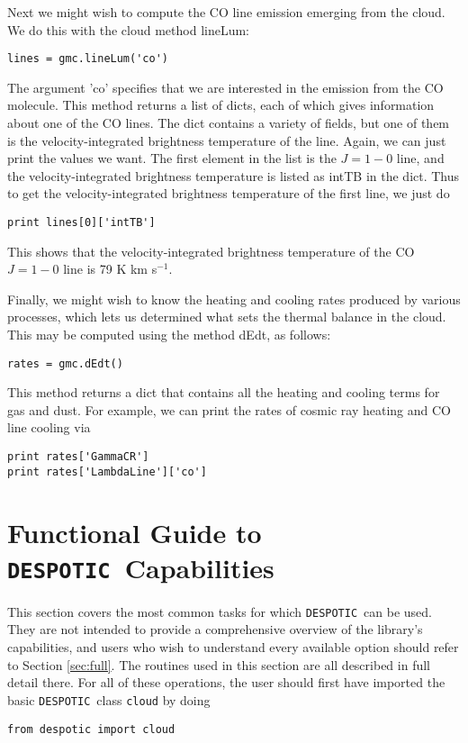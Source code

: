 \documentclass[12pt]{article}
\newcommand{\despotic}{\texttt{DESPOTIC}}
\begin{document}
Next we might wish to compute the CO line emission emerging from the cloud. We do this with the cloud method lineLum:
\begin{verbatim}
lines = gmc.lineLum('co')
\end{verbatim}
The argument 'co' specifies that we are interested in the emission from the CO molecule. This method returns a list of dicts, each of which gives information about one of the CO lines. The dict contains a variety of fields, but one of them is the velocity-integrated brightness temperature of the line. Again, we can just print the values we want. The first element in the list is the $J=1-0$ line, and the velocity-integrated brightness temperature is listed as intTB in the dict. Thus to get the velocity-integrated brightness temperature of the first line, we just do
\begin{verbatim}
print lines[0]['intTB']
\end{verbatim}
This shows that the velocity-integrated brightness temperature of the CO $J=1-0$ line is 79 K km s$^{-1}$.

Finally, we might wish to know the heating and cooling rates produced by various processes, which lets us determined what sets the thermal balance in the cloud. This may be computed using the method dEdt, as follows:
\begin{verbatim}
rates = gmc.dEdt()
\end{verbatim}
This method returns a dict that contains all the heating and cooling terms for gas and dust. For example, we can print the rates of cosmic ray heating and CO line cooling via
\begin{verbatim}
print rates['GammaCR']
print rates['LambdaLine']['co']
\end{verbatim}

\clearpage

\section{Functional Guide to \despotic\ Capabilities}

This section covers the most common tasks for which \despotic\ can be used. They are not intended to provide a comprehensive overview of the library's capabilities, and users who wish to understand every available option should refer to Section \ref{sec:full}. The routines used in this section are all described in full detail there. For all of these operations, the user should first have imported the basic \despotic\ class \verb=cloud= by doing
\begin{verbatim}
from despotic import cloud
\end{verbatim}
\end{document}
